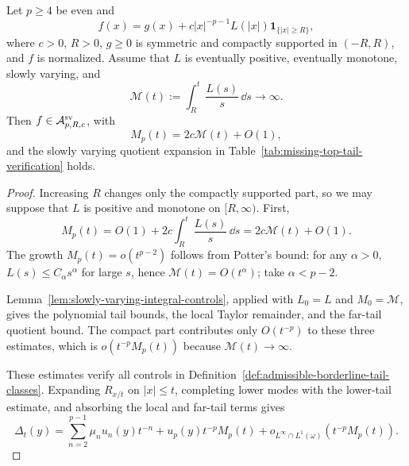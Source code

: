 \begin{lemma}
\label{lem:slowly-varying-borderline-tail-controls}
Let \(p\ge4\) be even and
\[
f(x)=g(x)+c|x|^{-p-1}L(|x|)\mathbf1_{\{|x|\ge R\}},
\]
where \(c>0\), \(R>0\), \(g\ge0\) is symmetric and compactly supported in
\((-R,R)\), and \(f\) is normalized.  Assume that \(L\) is eventually
positive, eventually monotone, slowly varying, and
\[
\mathcal M(t):=\int_R^t\frac{L(s)}{s}\,\dd s\to\infty .
\]
Then \(f\in\mathcal A_{p,R,c}^{\rm sv}\), with
\[
M_p(t)=2c\mathcal M(t)+O(1),
\]
and the slowly varying quotient expansion in
Table~\ref{tab:missing-top-tail-verification} holds.
\end{lemma}

\begin{proof}
Increasing \(R\) changes only the compactly supported part, so we may suppose
that \(L\) is positive and monotone on \([R,\infty)\).  First,
\[
M_p(t)=O(1)+2c\int_R^t\frac{L(s)}{s}\,\dd s
=2c\mathcal M(t)+O(1).
\]
The growth \(M_p(t)=o(t^{p-2})\) follows from Potter's bound: for any
\(\alpha>0\), \(L(s)\le C_\alpha s^\alpha\) for large \(s\), hence
\(\mathcal M(t)=O(t^\alpha)\); take \(\alpha<p-2\).

Lemma~\ref{lem:slowly-varying-integral-controls}, applied with
\(L_0=L\) and \(M_0=\mathcal M\), gives the polynomial tail bounds, the
local Taylor remainder, and the far-tail quotient bound.  The compact part
contributes only \(O(t^{-p})\) to these three estimates, which is
\(o(t^{-p}M_p(t))\) because \(\mathcal M(t)\to\infty\).

These estimates verify all controls in
Definition~\ref{def:admissible-borderline-tail-classes}.  Expanding
\(R_{x/t}\) on \(|x|\le t\), completing lower modes with the lower-tail
estimate, and absorbing the local and far-tail terms gives
\[
\Delta_t(y)=\sum_{n=2}^{p-1}\mu_nu_n(y)t^{-n}
+u_p(y)t^{-p}M_p(t)
+o_{L^\infty\cap L^1(\omega)}(t^{-p}M_p(t)).
\]
\end{proof}

